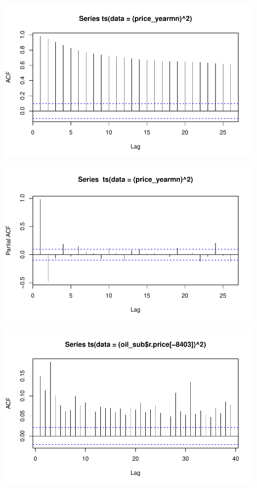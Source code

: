 \documentclass[11pt]{article}\usepackage[]{graphicx}\usepackage[]{color}
\makeatletter
\def\maxwidth{ %
  \ifdim\Gin@nat@width>\linewidth
    \linewidth
  \else
    \Gin@nat@width
  \fi
}
\newenvironment{knitrout}{}{} %
\makeatother
\begin{document}
\begin{knitrout}
{}




{\centering \includegraphics[width=\maxwidth]{figure/abs_plots-7} 

}




{\centering \includegraphics[width=\maxwidth]{figure/abs_plots-8} 

}




{\centering \includegraphics[width=\maxwidth]{figure/abs_plots-9} 

}
\end{knitrout}
\end{document}
